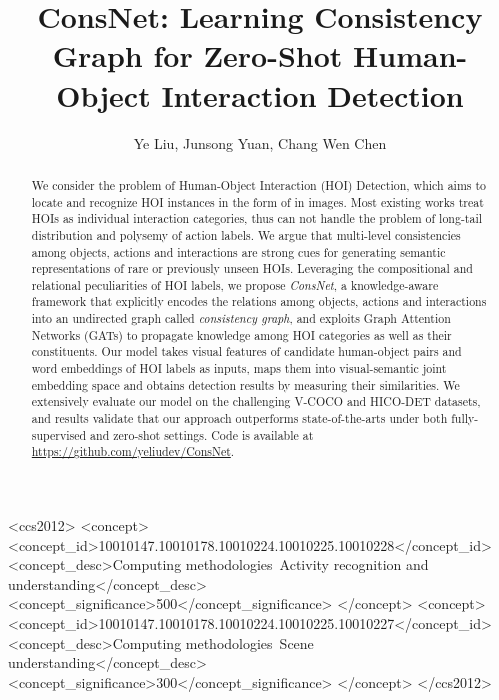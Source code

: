 \documentclass[sigconf,screen]{acmart}
\begin{document}
\title{ConsNet: Learning Consistency Graph for Zero-Shot Human-Object Interaction Detection}







\author{Ye Liu, Junsong Yuan, Chang Wen Chen}

\renewcommand{\authors}{Ye Liu, Junsong Yuan, and Chang Wen Chen}
\renewcommand{\shortauthors}{\authors}



\begin{abstract}

We consider the problem of Human-Object Interaction (HOI) Detection, which aims to locate and recognize HOI instances in the form of  in images. Most existing works treat HOIs as individual interaction categories, thus can not handle the problem of long-tail distribution and polysemy of action labels. We argue that multi-level consistencies among objects, actions and interactions are strong cues for generating semantic representations of rare or previously unseen HOIs. Leveraging the compositional and relational peculiarities of HOI labels, we propose \textit{ConsNet}, a knowledge-aware framework that explicitly encodes the relations among objects, actions and interactions into an undirected graph called \textit{consistency graph}, and exploits Graph Attention Networks (GATs) to propagate knowledge among HOI categories as well as their constituents. Our model takes visual features of candidate human-object pairs and word embeddings of HOI labels as inputs, maps them into visual-semantic joint embedding space and obtains detection results by measuring their similarities. We extensively evaluate our model on the challenging V-COCO and HICO-DET datasets, and results validate that our approach outperforms state-of-the-arts under both fully-supervised and zero-shot settings. Code is available at \href{https://github.com/yeliudev/ConsNet}{https://github.com/yeliudev/ConsNet}.

\end{abstract} 
\begin{CCSXML}
<ccs2012>
<concept>
<concept_id>10010147.10010178.10010224.10010225.10010228</concept_id>
<concept_desc>Computing methodologies~Activity recognition and understanding</concept_desc>
<concept_significance>500</concept_significance>
</concept>
<concept>
<concept_id>10010147.10010178.10010224.10010225.10010227</concept_id>
<concept_desc>Computing methodologies~Scene understanding</concept_desc>
<concept_significance>300</concept_significance>
</concept>
</ccs2012>
\end{CCSXML}
\end{document}
